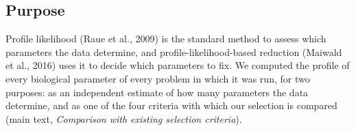 

\subsection*{Purpose}
Profile likelihood (Raue et al., 2009) is the standard method to assess which parameters the data determine, and profile-likelihood-based reduction (Maiwald et al., 2016) uses it to decide which parameters to fix. We computed the profile of every biological parameter of every problem in which it was run, for two purposes: as an independent estimate of how many parameters the data determine, and as one of the four criteria with which our selection is compared (main text, \emph{Comparison with existing selection criteria}).

